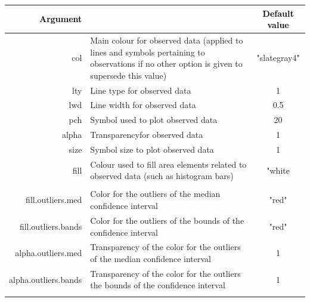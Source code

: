 \documentclass{report}
\begin{document}
\clearpage

\begin{table}[!h] 
\vspace{-2cm}
\begin{center}
\begin{tabular}{| r p{8cm} c|}
\hline
\textbf{\textcolor{black}{Argument}} & \centering{\textbf{\textcolor{black}{Description }}} & \textbf{\textcolor{black}{Default value}} \\
\hline
{\ttfamily col} & Main colour for observed data (applied to lines and symbols pertaining to observations if no other option is given to supersede this value) & "slategray4"  \\
{\ttfamily lty} & Line type for observed data & 1 \\
{\ttfamily lwd} & Line width for observed data & 0.5 \\
{\ttfamily pch} & Symbol used to plot observed data &  20 \\
{\ttfamily alpha} & Transparencyfor observed data  & 1 \\
{\ttfamily size} & Symbol size to plot observed data & 1  \\
{\ttfamily fill} & Colour used to fill area elements related to observed data (such as histogram bars) & "white  \\
{\ttfamily } & &  \\

{\ttfamily fill.outliers.med} & Color for the outliers of the median confidence interval & "red"  \\
{\ttfamily fill.outliers.bands} & Color for the outliers of  the bounds of the confidence interval & "red"  \\
{\ttfamily alpha.outliers.med} & Transparency of the color for the outliers of the median confidence interval & 1  \\
{\ttfamily alpha.outliers.bands} & Transparency of the color  for the outliers the bounds of the confidence interval & 1  \\
{\ttfamily } & &  \\


\end{tabular}
\end{center}
\end{table}
\end{document}
